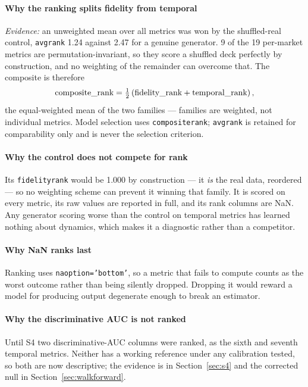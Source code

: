 \documentclass[11pt,a4paper]{article}
\makeatletter
\DeclareRobustCommand{\_}{\ifmmode\nfss@text{\textunderscore}\else\textunderscore\allowbreak\fi}
\makeatother
\begin{document}
\paragraph{Why the ranking splits fidelity from temporal} \textit{Evidence:} an unweighted mean over all metrics was won by the shuffled-real control, \texttt{avg\_rank} 1.24 against 2.47 for a genuine generator. 9 of the 19 per-market metrics are permutation-invariant, so they score a shuffled deck perfectly by construction, and no weighting of the remainder can overcome that. The composite is therefore
\[ \text{composite\_rank} = \tfrac{1}{2}\left(\text{fidelity\_rank} + \text{temporal\_rank}\right), \]
the equal-weighted mean of the two families --- families are weighted, not individual metrics. Model selection uses \texttt{composite\_rank}; \texttt{avg\_rank} is retained for comparability only and is never the selection criterion.

\paragraph{Why the control does not compete for rank} Its \texttt{fidelity\_rank} would be 1.000 by construction --- it \emph{is} the real data, reordered --- so no weighting scheme can prevent it winning that family. It is scored on every metric, its raw values are reported in full, and its rank columns are NaN. Any generator scoring worse than the control on temporal metrics has learned nothing about dynamics, which makes it a diagnostic rather than a competitor.

\paragraph{Why NaN ranks last} Ranking uses \texttt{na\_option='bottom'}, so a metric that fails to compute counts as the worst outcome rather than being silently dropped. Dropping it would reward a model for producing output degenerate enough to break an estimator.

\paragraph{Why the discriminative AUC is not ranked} Until S4 two discriminative-AUC columns were ranked, as the sixth and seventh temporal metrics. Neither has a working reference under any calibration tested, so both are now descriptive; the evidence is in Section~\ref{sec:s4} and the corrected null in Section~\ref{sec:walkforward}.
\end{document}
